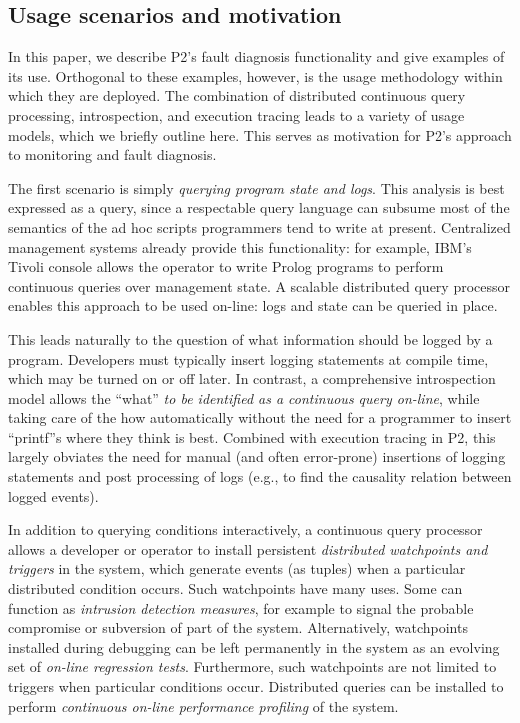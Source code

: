 \documentclass{sig-alt-full}
\def\Sys{P2\xspace}
\begin{document}
\subsection{Usage scenarios and motivation}

In this paper, we describe \Sys's fault diagnosis functionality and give
examples of its use.  Orthogonal to these examples, however, is the
usage methodology within which they are deployed.   The combination of
distributed continuous query processing, introspection, and execution
tracing leads to a variety of usage models, which we briefly outline
here.  This serves as motivation for \Sys's approach to monitoring and
fault diagnosis. 

The first scenario is simply \emph{querying program state and
  logs}.  This analysis is best expressed as a query, since a 
respectable query language can subsume most of the semantics of the
ad hoc scripts programmers tend to write at present.   Centralized
management systems 
already provide this functionality: for example, IBM's Tivoli console
allows the operator to write Prolog programs to perform continuous
queries over management state.  A scalable distributed query
processor enables this approach to be used on-line: logs and state can
be queried in place.  

This leads naturally to the question of what information should be
logged by a program.  Developers must typically insert
logging statements at compile time, which may be turned on or off
later.  In contrast, a comprehensive introspection model allows the ``what''
\emph{to be identified as a continuous query on-line}, while taking care
of the how automatically without the need for a programmer to insert
``printf''s where they think is best.  Combined with execution 
tracing in \Sys, this largely obviates the need for manual 
(and often error-prone) insertions of logging statements and post
processing of logs (e.g., to find the causality relation between logged events).


In addition to querying conditions interactively, a continuous query
processor allows a developer or operator to install persistent
\emph{distributed watchpoints and triggers} in the system, which
generate events (as tuples) when a particular distributed condition
occurs.   Such watchpoints have many uses.  Some can function as
\emph{intrusion detection measures}, for example to signal the
probable compromise or subversion of part of the system.  Alternatively,
watchpoints installed during debugging can be left permanently in the
system as an evolving set of \emph{on-line regression tests}. 
Furthermore, such watchpoints are not limited to triggers when
particular conditions occur.  Distributed
queries can be installed to perform \emph{continuous on-line performance
  profiling} of the system. 
\end{document}
